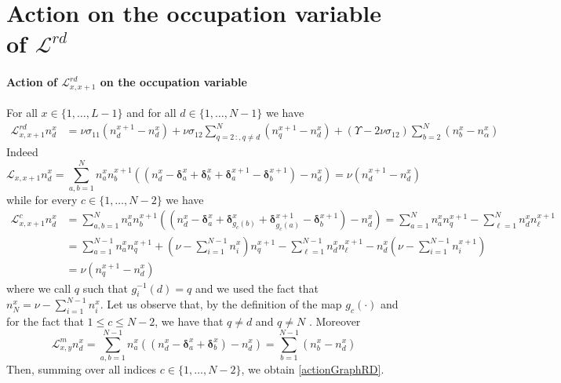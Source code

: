 \documentclass[10pt]{article}
\numberwithin{equation}{section}
\numberwithin{equation}{subsection}
\begin{document}
\section{Action on the occupation variable of $\mathcal{L}^{rd}$}\label{appendix-RD}
\paragraph{Action of $\mathcal{L}_{x,x+1}^{rd}$ on the occupation variable}
For all $x\in \{1,\ldots,L-1\}$ and for all $d\in \{1,\ldots,N-1\}$ we have
\begin{equation}\label{actionGraphRD}
	\begin{split}
		\mathcal{L}_{x,x+1}^{rd}n_{d}^{x}&=\nu \sigma_{11}(n_{d}^{x+1}-n_{d}^{x})+\nu\sigma_{12}\sum_{q=2\,:	,q\neq d}^{N}(n_{q}^{x+1}-n_{d}^{x})+(\Upsilon-2\nu\sigma_{12})\sum_{b=2}^{N}(n_{b}^{x}-n_{\alpha}^{x})
	\end{split}
\end{equation}
Indeed
\begin{equation}
	\mathcal{L}_{x,x+1}n_{d}^{x}=\sum_{a,b=1}^{N}n_{a}^{x}n_{b}^{x+1}\left((n_{d}^{x}-\bm{\delta}_{a}^{x}+\bm{\delta}_{b}^{x}+\bm{\delta}_{a}^{x+1}-\bm{\delta}_{b}^{x+1})-n_{d}^{x}\right)=\nu\left(n_{d}^{x+1}-n_{d}^{x}\right)
\end{equation}
while for every $c\in \{1,\ldots,N-2\}$ we have 
\begin{equation}
	\begin{split}
		\mathcal{L}_{x,x+1}^{c}n_{d}^{x}&=\sum_{a,b=1}^{N}n_{a}^{x}n_{b}^{x+1}\left((n_{d}^{x}-\bm{\delta}_{a}^{x}+\bm{\delta}_{g_{c}(b)}^{x}+\bm{\delta}_{g_{c}(a)}^{x+1}-\bm{\delta}_{b}^{x+1})-n_{d}^{x}\right)=\sum_{a=1}^{N}n_{a}^{x}n_{q}^{x+1}-\sum_{\ell=1}^{N}n_{d}^{x}n_{\ell}^{x+1}
		\\&=
		\sum_{a=1}^{N-1}n_{a}^{x}n_{q}^{x+1}+\left(\nu-\sum_{i=1}^{N-1}n_{i}^{x}\right)n_{q}^{x+1}-\sum_{\ell=1}^{N-1}n_{d}^{x}n_{\ell}^{x+1}-n_{d}^{x}\left(\nu-\sum_{i=1}^{N-1}n_{i}^{x+1}\right)
		\\&=
		\nu(n_{q}^{x+1}-n_{d}^{x})
	\end{split}
\end{equation}
where we call $q$ such that $g_{i}^{-1}(d)=q$ and we used the fact that $n_{N}^{x}=\nu-\sum_{i=1}^{N-1}n_{i}^{x}$. Let us observe that, by the definition of the map $g_{c}(\cdot)$ and for the fact that $1\leq c\leq N-2$, we have that $q\neq d$ and $q\neq N$ .
Moreover
\begin{equation}
	\mathcal{L}_{x,y}^{m}n_{d}^{x}=\sum_{a,b=1}^{N-1}n_{a}^{x}\left((n_{d}^{x}-\bm{\delta}_{a}^{x}+\bm{\delta}_{b}^{x})-n_{d}^{x}\right)=\sum_{b=1}^{N-1}(n_{b}^{x}-n_{d}^{x})
\end{equation}
Then, summing over all indices $c\in\{1,\ldots,N-2\}$, we obtain \eqref{actionGraphRD}.
\end{document}
